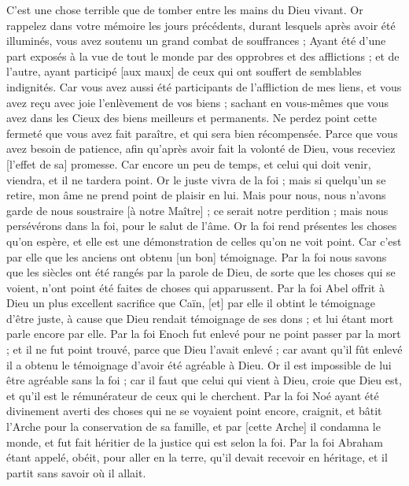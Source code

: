 \begin{multicols}{2}
C'est une chose terrible que de tomber entre les mains du Dieu vivant.
Or rappelez dans votre mémoire les jours précédents, durant lesquels après avoir été illuminés, vous avez soutenu un grand combat de souffrances ;
Ayant été d'une part exposés à la vue de tout le monde par des opprobres et des afflictions ; et de l'autre, ayant participé [aux maux] de ceux qui ont souffert de semblables indignités.
Car vous avez aussi été participants de l'affliction de mes liens, et vous avez reçu avec joie l'enlèvement de vos biens ; sachant en vous-mêmes que vous avez dans les Cieux des biens meilleurs et permanents.
Ne perdez point cette fermeté que vous avez fait paraître, et qui sera bien récompensée.
Parce que vous avez besoin de patience, afin qu'après avoir fait la volonté de Dieu, vous receviez [l'effet de sa] promesse.
Car encore un peu de temps, et celui qui doit venir, viendra, et il ne tardera point.
Or le juste vivra de la foi ; mais si quelqu'un se retire, mon âme ne prend point de plaisir en lui.
Mais pour nous, nous n'avons garde de nous soustraire [à notre Maître] ; ce serait notre perdition ; mais nous persévérons dans la foi, pour le salut de l'âme.
\VerseOne{}Or la foi rend présentes les choses qu'on espère, et elle est une démonstration de celles qu'on ne voit point.
Car c'est par elle que les anciens ont obtenu [un bon] témoignage.
Par la foi nous savons que les siècles ont été rangés par la parole de Dieu, de sorte que les choses qui se voient, n'ont point été faites de choses qui apparussent.
Par la foi Abel offrit à Dieu un plus excellent sacrifice que Caïn, [et] par elle il obtint le témoignage d'être juste, à cause que Dieu rendait témoignage de ses dons ; et lui étant mort parle encore par elle.
Par la foi Enoch fut enlevé pour ne point passer par la mort ; et il ne fut point trouvé, parce que Dieu l'avait enlevé ; car avant qu'il fût enlevé il a obtenu le témoignage d'avoir été agréable à Dieu.
Or il est impossible de lui être agréable sans la foi ; car il faut que celui qui vient à Dieu, croie que Dieu est, et qu'il est le rémunérateur de ceux qui le cherchent.
Par la foi Noé ayant été divinement averti des choses qui ne se voyaient point encore, craignit, et bâtit l'Arche pour la conservation de sa famille, et par [cette Arche] il condamna le monde, et fut fait héritier de la justice qui est selon la foi.
Par la foi Abraham étant appelé, obéit, pour aller en la terre, qu'il devait recevoir en héritage, et il partit sans savoir où il allait.

\end{multicols}
